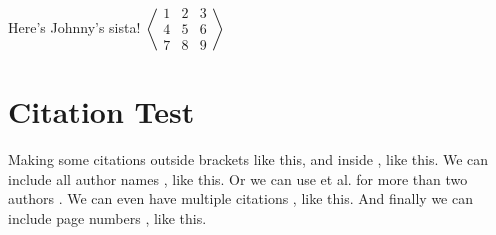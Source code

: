 \documentclass[a4paper, 10pt, english]{extarticle}
\begin{document}
Here's Johnny's sista!
$\left\langle
\begin{matrix}
1 & 2 & 3 \\
4 & 5 & 6 \\
7 & 8 & 9
\end{matrix}
\right\rangle$

\newpage
\section{Citation Test}
Making some citations outside brackets \cite{Bharathi.Sv2017} like this, and inside \citep{Bollen2010}, like this. We can include all author names \citep*{ElAlaoui2018}, like this. Or we can use et al. for more than two authors \citep{Kalyani2016}. We can even have multiple citations \citep{Kim2019}, like this. And finally we can include page numbers \citep[p.~22]{Kordonis2016}, like this.

\newpage


\end{document}
